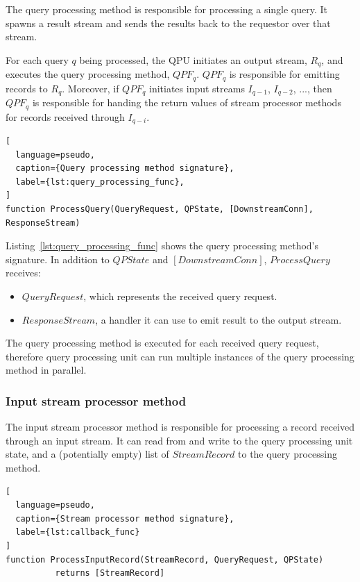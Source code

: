 The query processing method is responsible for processing a single query.
It spawns a result stream and sends the results back to the requestor over that stream.

For each query $q$ being processed, the QPU initiates an output stream, $R_q$,
and executes the query processing method, $QPF_q$.
$QPF_q$ is responsible for emitting records to $R_q$.
Moreover, if $QPF_q$ initiates input streams $I_{q-1}$, $I_{q-2}$, ..., then $QPF_q$ is responsible for handing the return
values of stream processor methods for records received through $I_{q-i}$.

\begin{lstlisting}[
  language=pseudo,
  caption={Query processing method signature},
  label={lst:query_processing_func},
]
function ProcessQuery(QueryRequest, QPState, [DownstreamConn], ResponseStream)
\end{lstlisting}

\noindent
Listing~\ref{lst:query_processing_func} shows the query processing method's signature.
In addition to $QPState$ and $[DownstreamConn]$, $ProcessQuery$ receives:

\begin{itemize}
  \item $QueryRequest$, which represents the received query request.

  \item $ResponseStream$, a handler it can use to emit result to the output stream.

\end{itemize}

The query processing method is executed for each received query request,
therefore query processing unit can run multiple instances of the query processing method in parallel.

\subsubsection{Input stream processor method}
\label{sec:callback_func}

The input stream processor method is responsible for processing a record received through an input stream.
It can read from and write to the query processing unit state,
and a (potentially empty) list of $StreamRecord$ to the query processing method.

\begin{lstlisting}[
  language=pseudo,
  caption={Stream processor method signature},
  label={lst:callback_func}
]
function ProcessInputRecord(StreamRecord, QueryRequest, QPState)
          returns [StreamRecord]
\end{lstlisting}


